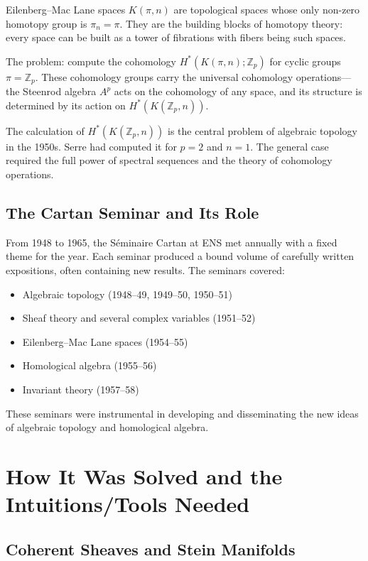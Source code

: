 Eilenberg--Mac Lane spaces $K(\pi, n)$ are topological spaces whose only non-zero homotopy group is $\pi_n = \pi$. They are the building blocks of homotopy theory: every space can be built as a tower of fibrations with fibers being such spaces.

The problem: compute the cohomology $H^*(K(\pi, n); \mathbb{Z}_p)$ for cyclic groups $\pi = \mathbb{Z}_p$. These cohomology groups carry the universal cohomology operations---the Steenrod algebra $A^p$ acts on the cohomology of any space, and its structure is determined by its action on $H^*(K(\mathbb{Z}_p, n))$.

The calculation of $H^*(K(\mathbb{Z}_p, n))$ is the central problem of algebraic topology in the 1950s. Serre had computed it for $p=2$ and $n=1$. The general case required the full power of spectral sequences and the theory of cohomology operations.

\subsection{The Cartan Seminar and Its Role}

From 1948 to 1965, the S{\'e}minaire Cartan at ENS met annually with a fixed theme for the year. Each seminar produced a bound volume of carefully written expositions, often containing new results. The seminars covered:
\begin{itemize}
    \item Algebraic topology (1948--49, 1949--50, 1950--51)
    \item Sheaf theory and several complex variables (1951--52)
    \item Eilenberg--Mac Lane spaces (1954--55)
    \item Homological algebra (1955--56)
    \item Invariant theory (1957--58)
\end{itemize}

These seminars were instrumental in developing and disseminating the new ideas of algebraic topology and homological algebra.

\section{How It Was Solved and the Intuitions/Tools Needed}

\subsection{Coherent Sheaves and Stein Manifolds}


